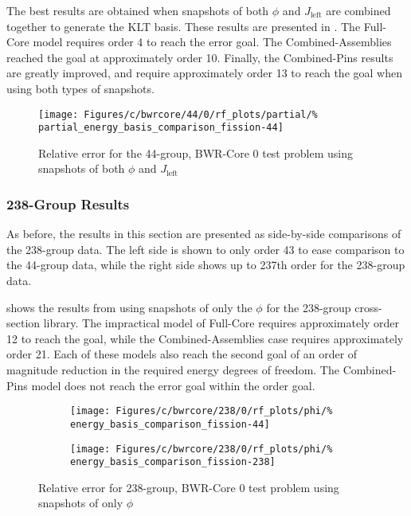 The best results are obtained when snapshots of both $\phi$ and 
$J_{\text{left}}$ are combined together to generate the KLT basis.  
These results are presented in .  The Full-Core 
model requires order 4 to reach the error goal.  The Combined-Assemblies 
reached the goal at approximately order 10.  Finally, the Combined-Pins results 
are greatly improved, and require approximately order 13 to reach the goal when 
using both types of snapshots.

\begin{figure*}[tb]
    \centering
    \texttt{[image: Figures/c/bwrcore/44/0/rf\_plots/partial/\%
        partial\_energy\_basis\_comparison\_fission-44]}
    \caption{Relative error for the 44-group, BWR-Core 0 test problem using 
        snapshots of both $\phi$ and $J_{\text{left}}$}
    \label{fig:BWR0_combined}
\end{figure*}

\subsubsection{238-Group Results}

As before, the results in this section are presented as side-by-side 
comparisons of the 238-group data.  The left side is shown to only order 43 to 
ease comparison to the 44-group data, while the right side shows up to 
237th order for the 238-group data.

 shows the results from using snapshots of only the 
$\phi$ for the 238-group cross-section library.  The impractical model of 
Full-Core requires approximately order 12 to reach the goal, while the 
Combined-Assemblies case requires approximately order 21.  Each of these models 
also 
reach the second goal of an order of magnitude reduction in the required energy 
degrees of freedom.  The Combined-Pins model does not reach the error goal 
within the order goal.  

\begin{figure*}[tb]
    \centering
    \begin{subfigure}{0.5\textwidth}
        \centering
    \texttt{[image: Figures/c/bwrcore/238/0/rf\_plots/phi/\%
        energy\_basis\_comparison\_fission-44]}
    \end{subfigure}%
    \begin{subfigure}{0.5\textwidth}
        \centering
    \texttt{[image: Figures/c/bwrcore/238/0/rf\_plots/phi/\%
        energy\_basis\_comparison\_fission-238]}
    \end{subfigure}
    \caption{Relative error for 238-group, BWR-Core 0 test problem using 
        snapshots of only $\phi$}
    \label{fig:BWR0_phi-238}
\end{figure*}

